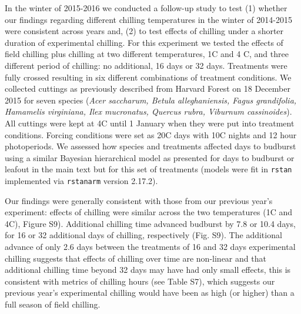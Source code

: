 \documentclass{article}
\begin{document}
\noindent In the winter of 2015-2016 we conducted a follow-up study to test (1) whether our findings regarding different chilling temperatures in the winter of 2014-2015 were consistent across years and, (2) to test effects of chilling under a shorter duration of experimental chilling. For this experiment we tested the effects of field chilling plus chilling at two different temperatures, 1\degree C and 4 \degree C, and three different period of chilling: no additional, 16 days or 32 days. Treatments were fully crossed resulting in six different combinations of treatment conditions. We collected cuttings as previously described from Harvard Forest on 18 December 2015 for seven species (\emph{Acer saccharum, Betula alleghaniensis, Fagus grandifolia, Hamamelis virginiana, Ilex mucronatus, Quercus rubra, Viburnum cassinoides}). All cuttings were kept at 4\degree C until 1 January when they were put into treatment conditions. Forcing conditions were set as 20\degree C days with 10\degree C nights and 12 hour photoperiods. We assessed how species and treatments affected days to budburst using a similar Bayesian hierarchical model as presented for days to budburst or leafout in the main text but for this set of treatments (models were fit in \verb|rstan| implemented via  \verb|rstanarm| version 2.17.2). 

\noindent Our findings were generally consistent with those from our previous year's experiment: effects of chilling were similar across the two temperatures (1\degree C and 4\degree C), Figure S9). Additional chilling time advanced budburst by 7.8 or 10.4 days, for 16 or 32 additional days of chilling, respectively (Fig. S9). The additional advance of only 2.6 days between the treatments of 16 and 32 days experimental chilling suggests that effects of chilling over time are non-linear and that additional chilling time beyond 32 days may have had only small effects, this is consistent with metrics of chilling hours (see Table S7), which suggests our previous year's experimental chilling would have been as high (or higher) than a full season of field chilling. 



\end{document}
